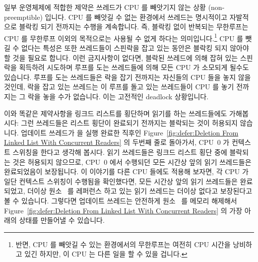 일부 운영체제에 적합한 제약은 쓰레드가 CPU 를
빼앗기지 않는 상황 (non-preemptible) 입니다.
CPU 를 빼앗길 수 없는 환경에서 쓰레드는 명시적이고 자발적으로
블락킹 되기 전까지는 수행을 계속합니다.
즉, 블락킹 없이 반복되는 무한루프는 CPU 를
무한루프 이외의 목적으로는 사용될 수 없게 하다는 의미입니다.\footnote{
	반면, CPU 를 빼앗길 수 있는 환경에서의 무한루프는 여전히 CPU 시간을
	낭비하고 있긴 하지만, 이 CPU 는 다른 일을 할 수 있을 겁니다.}
CPU 를 뺏길 수 없다는 특성은 또한 쓰레드들이 스핀락을 잡고 있는 동안은 블락킹
되지 않아야 할 것을 필요로 합니다.
이런 금지사항이 없다면, 블락된 쓰레드에 의해 잡혀 있는 스핀락을 획득하려
시도하며 루프를 도는 쓰레드들에 의해 모든 CPU 가 소모되게 될수도 있습니다.
루프를 도는 쓰레드들은 락을 잡기 전까지는 자신들의 CPU 들을 놓지 않을 것인데,
락을 잡고 있는 쓰레드는 이 루프를 돌고 있는 쓰레드들이 CPU 를 놓기 전까지는 그
락을 놓을 수가 없습니다.
이는 고전적인 deadlock 상황입니다.
\iffalse
One constraint that fits well with some operating-system kernels is to
consider the case where threads are not subject to preemption.
In such non-preemptible environments, each thread runs until it
explicitly and voluntarily blocks.
This means that an infinite loop without blocking will render a CPU
useless for any other purpose from the start of the infinite loop
onwards.\footnote{
	In contrast, an infinite loop in a preemptible environment
	might be preempted.
	This infinite loop might still waste considerable CPU time,
	but the CPU in question would nevertheless be able to do
	other work.}
Non-preemptibility also requires that threads be prohibited from blocking
while holding spinlocks.
Without this prohibition, all CPUs might be consumed by threads
spinning attempting to acquire a spinlock held by a blocked thread.
The spinning threads will not relinquish their CPUs until they acquire
the lock, but the thread holding the lock cannot possibly release it
until one of the spinning threads relinquishes a CPU.
This is a classic deadlock situation.
\fi

이와 똑같은 제약사항을 링크드 리스트를 횡단하며 읽기를 하는 쓰레드들에도
가해봅시다: 그런 쓰레드들은 리스트 횡단이 완료되기 전까지는 블락되는 것이
허용되지 않습니다.
업데이트 쓰레드가  을 실행 완료한 직후인
Figure~\ref{fig:defer:Deletion From Linked List With Concurrent Readers} 의
두번째 줄로 돌아가서, CPU~0 가 컨텍스트 스위칭을 한다고 생각해 봅시다.
읽기 쓰레드들은 링크드 리스트 횡단 중에 블락되는 것은 허용되지 않으므로, CPU~0
에서 수행되던 모든 시간상 앞의 읽기 쓰레드들은 완료되었음이 보장됩니다.
이 이야기를 다른 CPU 들에도 적용해 보자면, 각 CPU 가 일단 컨텍스트 스위칭이
수행됨을 확인했다면, 모든 시간상 앞의 읽기 쓰레드들은 완료되었고, 더이상
원소~ 를 레퍼런스 하고 있는 읽기 쓰레드는 더이상 없다고 보장된다고 볼 수
있습니다.
그렇다면 업데이트 쓰레드는 안전하게 원소~ 를 메모리 해제해서
Figure~\ref{fig:defer:Deletion From Linked List With Concurrent Readers} 의
가장 아래의 상태를 만들어낼 수 있습니다.
\iffalse

